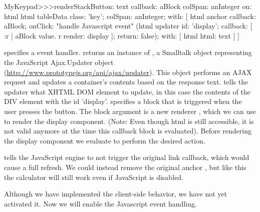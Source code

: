 \documentclass[a4paper,10pt,twoside]{book}
\begin{document}

\begin{code}{}
MyKeypad>>>renderStackButton: text callback: aBlock colSpan: anInteger on: html 
	html tableData
		class: 'key';
		colSpan: anInteger;
		with: [
			html anchor
				callback: aBlock;
				onClick:				"handle Javascript event"
					(html updater
						id: 'display';
						callback: [ :r |
							aBlock value.
							r render: display ];
						return: false);
				with: [ html html: text ] ]
\end{code}

 specifies a  event handler.
 returns an instance of , a Smalltalk object representing the JavaScript Ajax.Updater object (\url{http://www.prototypejs.org/api/ajax/updater}).
This object performs an AJAX request and updates a container's contents based on the response text.
 tells the updater what XHTML DOM element to update, in this case the contents of the DIV element with the id 'display'.
 specifies a block that is triggered when the user presses the button.
The block argument is a new renderer , which we can use to render the display component.
(Note: Even though html is still accessible, it is not valid anymore at the time this callback block is evaluated).
Before rendering the display component we evaluate  to perform the desired action.

 tells the JavaScript engine to not trigger the original link callback, which would cause a full refresh.
We could instead remove the original anchor , but like this the calculator will still work even if JavaScript is disabled.


Although we have implemented the client-side behavior, we have not yet activated it.
Now we will enable the Javascript event handling.

\end{document}
